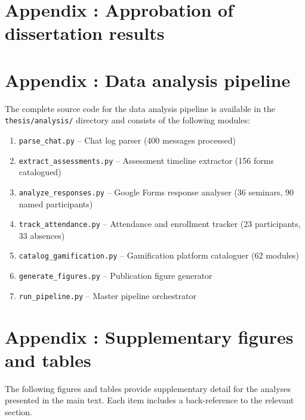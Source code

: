 \setcounter{table}{0}\setcounter{figure}{0}
\label{app:D}
\section*{Appendix \theappx: Approbation of dissertation results}

\printconf

\setcounter{table}{0}\setcounter{figure}{0}
\label{app:E}
\section*{Appendix \theappx: Data analysis pipeline}

The complete source code for the data analysis pipeline is available in the \texttt{thesis/analysis/} directory and consists of the following modules:

\begin{enumerate}
\item \texttt{parse\_chat.py} -- Chat log parser (400 messages processed)
\item \texttt{extract\_assessments.py} -- Assessment timeline extractor (156 forms catalogued)
\item \texttt{analyze\_responses.py} -- Google Forms response analyser (36 seminars, 90 named participants)
\item \texttt{track\_attendance.py} -- Attendance and enrollment tracker (23 participants, 33 absences)
\item \texttt{catalog\_gamification.py} -- Gamification platform cataloguer (62 modules)
\item \texttt{generate\_figures.py} -- Publication figure generator
\item \texttt{run\_pipeline.py} -- Master pipeline orchestrator
\end{enumerate}

\setcounter{table}{0}\setcounter{figure}{0}
\label{app:F}
\section*{Appendix \theappx: Supplementary figures and tables}

The following figures and tables provide supplementary detail for the analyses presented in the main text. Each item includes a back-reference to the relevant section.

